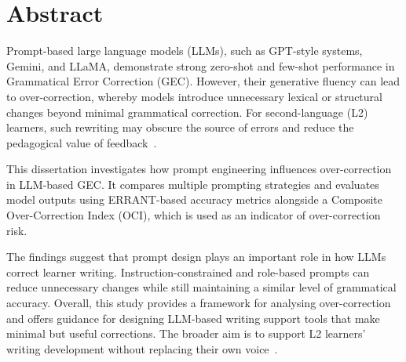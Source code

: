 \chapter*{\Large \center Abstract}

Prompt-based large language models (LLMs), such as GPT-style systems, Gemini, and LLaMA, demonstrate strong zero-shot and few-shot performance in Grammatical Error Correction (GEC). However, their generative fluency can lead to over-correction, whereby models introduce unnecessary lexical or structural changes beyond minimal grammatical correction. For second-language (L2) learners, such rewriting may obscure the source of errors and reduce the pedagogical value of feedback~\cite{loem2023exploringeffectivenessgpt3grammatical}.

This dissertation investigates how prompt engineering influences over-correction in LLM-based GEC. It compares multiple prompting strategies and evaluates model outputs using ERRANT-based accuracy metrics alongside a Composite Over-Correction Index (OCI), which is used as an indicator of over-correction risk.

The findings suggest that prompt design plays an important role in how LLMs correct learner writing. Instruction-constrained and role-based prompts can reduce unnecessary changes while still maintaining a similar level of grammatical accuracy. Overall, this study provides a framework for analysing over-correction and offers guidance for designing LLM-based writing support tools that make minimal but useful corrections. The broader aim is to support L2 learners' writing development without replacing their own voice~\cite{park-etal-2025-leveraging}.
